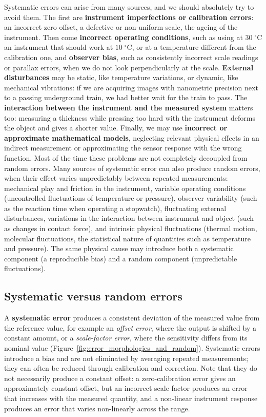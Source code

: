 \documentclass[letterpaper,11pt,leqno]{book}
\begin{document}
Systematic errors can arise from many sources, and we should absolutely try to avoid them. The first are \textbf{instrument imperfections or calibration errors}: an incorrect zero offset, a defective or non-uniform scale, the ageing of the instrument. Then come \textbf{incorrect operating conditions}, such as using at $30\;^\circ\text{C}$ an instrument that should work at $10\;^\circ\text{C}$, or at a temperature different from the calibration one, and \textbf{observer bias}, such as consistently incorrect scale readings or parallax errors, when we do not look perpendicularly at the scale. \textbf{External disturbances} may be static, like temperature variations, or dynamic, like mechanical vibrations: if we are acquiring images with nanometric precision next to a passing underground train, we had better wait for the train to pass. The \textbf{interaction between the instrument and the measured system} matters too: measuring a thickness while pressing too hard with the instrument deforms the object and gives a shorter value. Finally, we may use \textbf{incorrect or approximate mathematical models}, neglecting relevant physical effects in an indirect measurement or approximating the sensor response with the wrong function.
Most of the time these problems are not completely decoupled from random errors. Many sources of systematic error can also produce random errors, when their effect varies unpredictably between repeated measurements: mechanical play and friction in the instrument, variable operating conditions (uncontrolled fluctuations of temperature or pressure), observer variability (such as the reaction time when operating a stopwatch), fluctuating external disturbances, variations in the interaction between instrument and object (such as changes in contact force), and intrinsic physical fluctuations (thermal motion, molecular fluctuations, the statistical nature of quantities such as temperature and pressure). The same physical cause may introduce both a systematic component (a reproducible bias) and a random component (unpredictable fluctuations).

\subsection{Systematic versus random errors}

A \textbf{systematic error} produces a consistent deviation of the measured value from the reference value, for example an \emph{offset error}, where the output is shifted by a constant amount, or a \emph{scale-factor error}, where the sensitivity differs from its nominal value (Figure~\ref{fig:error_morphologies_and_random}). Systematic errors introduce a bias and are not eliminated by averaging repeated measurements; they can often be reduced through calibration and correction. Note that they do not necessarily produce a constant offset: a zero-calibration error gives an approximately constant offset, but an incorrect scale factor produces an error that increases with the measured quantity, and a non-linear instrument response produces an error that varies non-linearly across the range.
\end{document}
